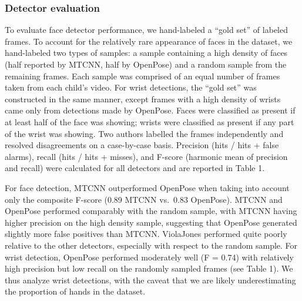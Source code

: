 \documentclass[english,man]{apa6}
\begin{document}
\subsubsection{Detector evaluation}\label{detector-evaluation}

To evaluate face detector performance, we hand-labeled a \enquote{gold
set} of labeled frames. To account for the relatively rare appearance of
faces in the dataset, we hand-labeled two types of samples: a sample
containing a high density of faces (half reported by MTCNN, half by
OpenPose) and a random sample from the remaining frames. Each sample was
comprised of an equal number of frames taken from each child's video.
For wrist detections, the \enquote{gold set} was constructed in the same
manner, except frames with a high density of wrists came only from
detections made by OpenPose. Faces were classified as present if at
least half of the face was showing; wrists were classified as present if
any part of the wrist was showing. Two authors labelled the frames
independently and resolved disagreements on a case-by-case basis.
Precision (hits / hits + false alarms), recall (hits / hits + misses),
and F-score (harmonic mean of precision and recall) were calculated for
all detectors and are reported in Table 1.

For face detection, MTCNN outperformed OpenPose when taking into account
only the composite F-score (0.89 MTCNN vs.~0.83 OpenPose). MTCNN and
OpenPose performed comparably with the random sample, with MTCNN having
higher precision on the high density sample, suggesting that OpenPose
generated slightly more false positives than MTCNN. ViolaJones performed
quite poorly relative to the other detectors, especially with respect to
the random sample. For wrist detection, OpenPose performed moderately
well (F = 0.74) with relatively high precision but low recall on the
randomly sampled frames (see Table 1). We thus analyze wrist detections,
with the caveat that we are likely underestimating the proportion of
hands in the dataset.
\end{document}
